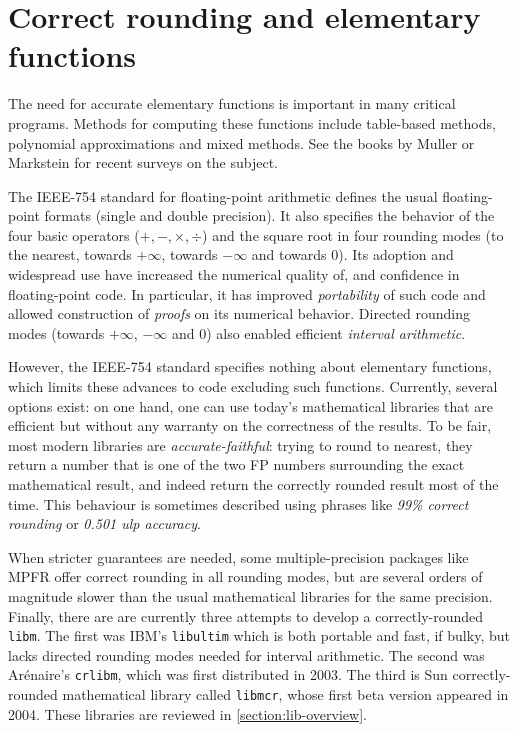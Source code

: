 


\section{Correct rounding and elementary functions}
\label{sect:intro}

The need for accurate elementary functions is important in many
critical programs.  Methods for computing these functions include
table-based methods\cite{Far81,Tan91}, polynomial approximations and
mixed methods\cite{DauMor2k}. See the books by Muller\cite{Muller97} or
Markstein\cite{Markstein2000} for recent surveys on the subject.

The IEEE-754 standard for floating-point arithmetic\cite{IEEE754}
defines the usual floating-point formats (single and double
precision). It also specifies the behavior of the four basic operators
($+,-,\times,\div$) and the square root in four rounding modes (to the
nearest, towards $+\infty$, towards $-\infty$ and towards $0$). Its
adoption and widespread use have increased the numerical quality of,
and confidence in floating-point code. In particular, it has improved
\emph{portability} of such code and allowed construction of
\emph{proofs} on its numerical behavior. Directed rounding modes
(towards $+\infty$, $-\infty$ and $0$) also enabled efficient
\emph{interval arithmetic}\cite{Moore66,KKLRW93}.

However, the IEEE-754 standard specifies nothing about elementary
functions, which limits these advances to code excluding such
functions.  Currently, several options exist: on one hand, one can use
today's mathematical libraries that are efficient but without any
warranty on the correctness of the results. To be fair, most modern
libraries are \emph{accurate-faithful}: trying to round to nearest,
they return a number that is one of the two FP numbers surrounding the
exact mathematical result, and indeed return the correctly rounded
result most of the time. This behaviour is sometimes described using
phrases like \emph{99\% correct rounding} or \emph{0.501 ulp accuracy}.

When stricter guarantees are needed, some multiple-precision packages
like MPFR \cite{MPFRweb} offer correct rounding in all rounding modes,
but are several orders of magnitude slower than the usual mathematical
libraries for the same precision. Finally, there are are currently
three attempts to develop a correctly-rounded \texttt{libm}. The first
was IBM's \texttt{libultim}\cite{IBMlibultimweb} which is both
portable and fast, if bulky, but lacks directed rounding modes needed
for interval arithmetic. The second was Ar\'enaire's \texttt{crlibm},
which was first distributed in 2003. The third is Sun
correctly-rounded mathematical library called \texttt{libmcr}, whose
first beta version appeared in 2004.  These libraries are reviewed in
\ref{section:lib-overview}.

